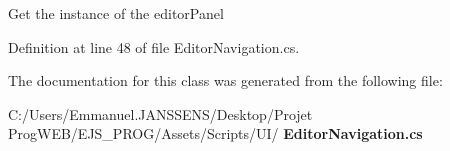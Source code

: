 Get the instance of the editor\+Panel 



Definition at line 48 of file Editor\+Navigation.\+cs.



The documentation for this class was generated from the following file\+:\begin{DoxyCompactItemize}
\item 
C\+:/\+Users/\+Emmanuel.\+J\+A\+N\+S\+S\+E\+N\+S/\+Desktop/\+Projet Prog\+W\+E\+B/\+E\+J\+S\+\_\+\+P\+R\+O\+G/\+Assets/\+Scripts/\+U\+I/\textbf{ Editor\+Navigation.\+cs}\end{DoxyCompactItemize}
